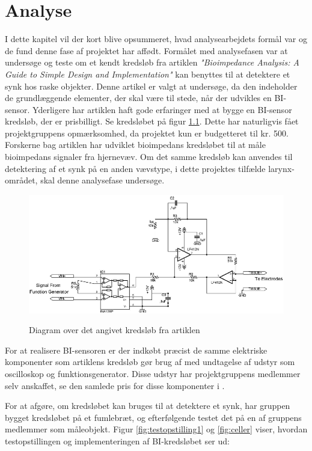 \chapter{Analyse}

 
I dette kapitel vil der kort blive opsummeret, hvad analysearbejdets formål var og de fund denne fase af projektet har affødt. Formålet med analysefasen var  at undersøge og teste om et kendt kredsløb fra artiklen \textit{"Bioimpedance Analysis: A Guide to Simple Design and Implementation"} kan benyttes til at detektere et synk hos raske objekter. Denne artikel er valgt at undersøge, da den indeholder de grundlæggende elementer, der skal være til stede, når der udvikles en BI-sensor. Yderligere har artiklen haft gode erfaringer med at bygge en BI-sensor kredsløb, der er prisbilligt. Se kredsløbet på figur \ref{fig:BIdiagram}. Dette har naturligvis fået projektgruppens opmærksomhed, da projektet kun er budgetteret til kr. 500. Forskerne bag artiklen har udviklet bioimpedans kredsløbet til at måle bioimpedans signaler fra hjernevæv. Om det samme kredsløb kan anvendes til detektering af et synk på en anden vævstype, i dette projektes tilfælde larynx-området, skal denne analysefase undersøge. \\

\begin{figure}[H]
\centering
{\includegraphics[width=\linewidth]
{Figure/BIdiagram}}
\caption{Diagram over det angivet kredsløb fra artiklen\cite{Aroom2009}}
\label{fig:BIdiagram}
\end{figure}

For at realisere BI-sensoren er der indkøbt præcist de samme elektriske komponenter som artiklens kredsløb gør brug af med undtagelse af udstyr som oscilloskop og funktionsgenerator. Disse udstyr har projektgruppens medlemmer selv anskaffet, se den samlede pris for disse komponenter i .

For at afgøre, om kredsløbet kan bruges til at detektere et synk, har gruppen bygget kredsløbet på et fumlebræt, og efterfølgende testet det på en af gruppens medlemmer som måleobjekt. Figur \ref{fig:testopstilling1} og \ref{fig:celler} viser, hvordan testopstillingen og implementeringen af BI-kredsløbet ser ud:

